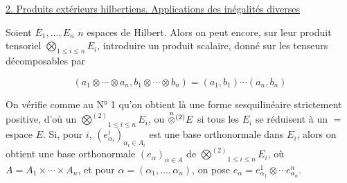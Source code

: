 \uline{2. Produits extérieurs hilbertiens. Applications  des inégalités diverses}

Soient $E_1,\ldots,E_n$ $n$ espaces de Hilbert. Alors on peut
encore, sur leur produit tensoriel $\bigotimes_{1\leq i\leq n}E_i$, introduire
un produit scalaire, donné sur les tenseurs décomposables
par

\[
(a_1\otimes\cdots\otimes a_n,b_1\otimes\cdots\otimes b_n)=(a_1,b_1)\cdots(a_n,b_n) \tag*{(1)}
\]

On vérifie comme au N° 1 qu'on obtient là une
forme sesquilinéaire  strictement positive,  d'où un
$\overset{(2)}{\bigotimes}_{1\leq i\leq n}E_i$, ou $\overset{n}{\otimes}\vphantom{\otimes}^{(2)}E$ si tous les $E_i$ se réduisent
à un $=$ espace $E$. Si, pour  $i$,
$(e^i_{\alpha_i})_{\alpha_i\in A_i}$ est une base orthonormale dans $E_i$,
alors on obtient une base orthonormale
$(e_\alpha)_{\alpha\in A}$ de $\overset{(2)}{\bigotimes}_{1\leq i\leq n}E_i$, où $A=A_1\times\cdots\times A_n$,
et pour $\alpha=(\alpha_1,\ldots,\alpha_n)$, on pose $e_\alpha=e^1_{\alpha_1}\otimes\cdots e^n_{\alpha_n}$.


